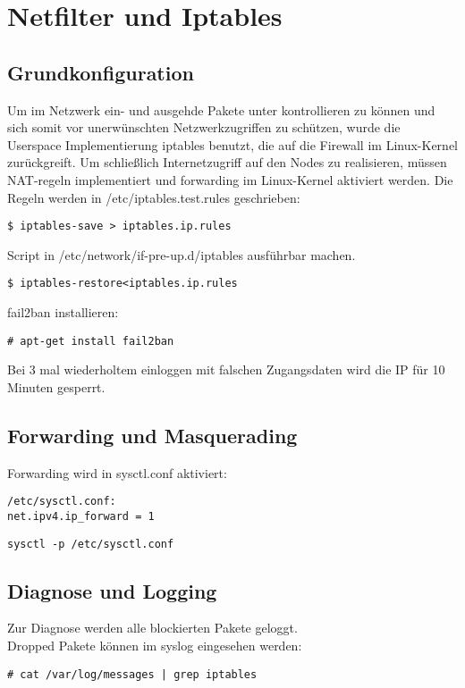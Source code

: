 \chapter{Netfilter und Iptables}
\section{Grundkonfiguration}
Um im Netzwerk ein- und ausgehde Pakete unter kontrollieren zu können 
und sich somit vor unerwünschten Netzwerkzugriffen zu schützen, wurde die 
Userspace Implementierung iptables benutzt, die auf die Firewall im Linux-Kernel zurückgreift.
Um schließlich Internetzugriff auf den Nodes zu realisieren,
müssen NAT-regeln implementiert und forwarding im Linux-Kernel aktiviert werden.
Die Regeln werden in /etc/iptables.test.rules geschrieben:

\begin{lstlisting}[style=Bash]
$ iptables-save > iptables.ip.rules
\end{lstlisting}
Script in /etc/network/if-pre-up.d/iptables ausführbar machen.\\
\begin{lstlisting}[style=Bash]
$ iptables-restore<iptables.ip.rules
\end{lstlisting}
fail2ban installieren:
\begin{lstlisting}[style=Bash]
# apt-get install fail2ban
\end{lstlisting}
Bei 3 mal wiederholtem einloggen mit falschen Zugangsdaten wird die IP für 10 Minuten gesperrt.
\section{Forwarding und Masquerading}
Forwarding wird in sysctl.conf aktiviert:
\begin{lstlisting}[style=Bash]
/etc/sysctl.conf:
net.ipv4.ip_forward = 1
\end{lstlisting}
\begin{lstlisting}[style=Bash]
sysctl -p /etc/sysctl.conf
\end{lstlisting}
\section{Diagnose und Logging}
Zur Diagnose werden alle blockierten Pakete geloggt.\\
Dropped Pakete können im syslog eingesehen werden:
\begin{lstlisting}[style=Bash]
# cat /var/log/messages | grep iptables
\end{lstlisting}
